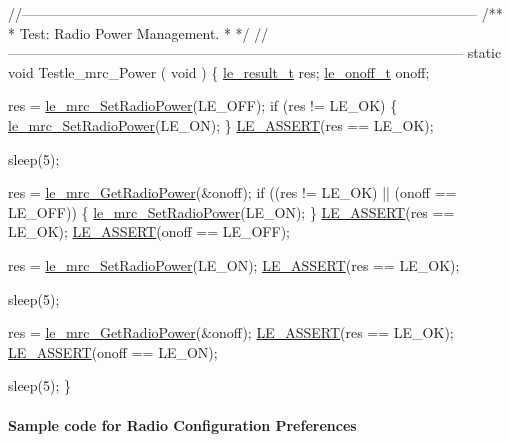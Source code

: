 \begin{DoxyCodeInclude}
\textcolor{comment}{//--------------------------------------------------------------------------------------------------}\textcolor{comment}{}
\textcolor{comment}{/**}
\textcolor{comment}{ * Test: Radio Power Management.}
\textcolor{comment}{ *}
\textcolor{comment}{ */}
\textcolor{comment}{//--------------------------------------------------------------------------------------------------}
\textcolor{keyword}{static} \textcolor{keywordtype}{void} Testle\_mrc\_Power
(
    \textcolor{keywordtype}{void}
)
\{
    \hyperlink{le__basics_8h_a1cca095ed6ebab24b57a636382a6c86c}{le\_result\_t}   res;
    \hyperlink{le__basics_8h_ae2138c90c41d30e2d510be01d8b374da}{le\_onoff\_t}    onoff;

    res = \hyperlink{le__mrc__interface_8h_a78bd27d92337e2122320f41bcaa5480f}{le\_mrc\_SetRadioPower}(LE\_OFF);
    \textcolor{keywordflow}{if} (res != LE\_OK)
    \{
        \hyperlink{le__mrc__interface_8h_a78bd27d92337e2122320f41bcaa5480f}{le\_mrc\_SetRadioPower}(LE\_ON);
    \}
    \hyperlink{le__log_8h_ac0dbbef91dc0fed449d0092ff0557b39}{LE\_ASSERT}(res == LE\_OK);

    sleep(5);

    res = \hyperlink{le__mrc__interface_8h_aac51332c6c84e460746eb1ad45c064d6}{le\_mrc\_GetRadioPower}(&onoff);
    \textcolor{keywordflow}{if} ((res != LE\_OK) || (onoff == LE\_OFF))
    \{
        \hyperlink{le__mrc__interface_8h_a78bd27d92337e2122320f41bcaa5480f}{le\_mrc\_SetRadioPower}(LE\_ON);
    \}
    \hyperlink{le__log_8h_ac0dbbef91dc0fed449d0092ff0557b39}{LE\_ASSERT}(res == LE\_OK);
    \hyperlink{le__log_8h_ac0dbbef91dc0fed449d0092ff0557b39}{LE\_ASSERT}(onoff == LE\_OFF);

    res = \hyperlink{le__mrc__interface_8h_a78bd27d92337e2122320f41bcaa5480f}{le\_mrc\_SetRadioPower}(LE\_ON);
    \hyperlink{le__log_8h_ac0dbbef91dc0fed449d0092ff0557b39}{LE\_ASSERT}(res == LE\_OK);

    sleep(5);

    res = \hyperlink{le__mrc__interface_8h_aac51332c6c84e460746eb1ad45c064d6}{le\_mrc\_GetRadioPower}(&onoff);
    \hyperlink{le__log_8h_ac0dbbef91dc0fed449d0092ff0557b39}{LE\_ASSERT}(res == LE\_OK);
    \hyperlink{le__log_8h_ac0dbbef91dc0fed449d0092ff0557b39}{LE\_ASSERT}(onoff == LE\_ON);

    sleep(5);
\}
\end{DoxyCodeInclude}
\hypertarget{c_mrcRadioConfigurationPreferences}{}\paragraph{Sample code for Radio Configuration Preferences}\label{c_mrcRadioConfigurationPreferences}

